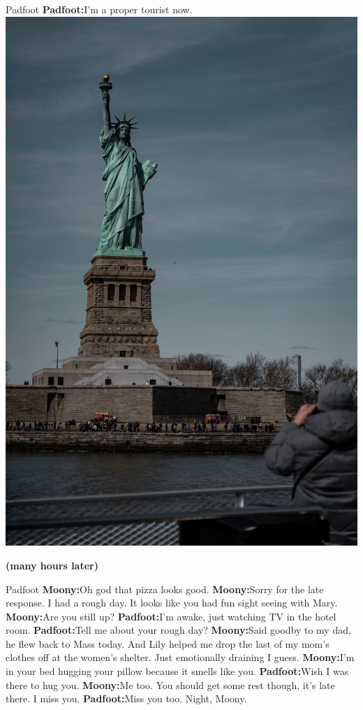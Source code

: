 \documentclass[12pt,twoside,openright]{memoir}
\begin{document}
Padfoot\newline
\textbf{Padfoot:}I'm a proper tourist now.  {\centering\includegraphics[width=\textwidth]{xiaochuan-xu-0fMSLUYClVI-unsplash}}

\textbf{(many hours later)} 

Padfoot\newline
\textbf{Moony:}Oh god that pizza looks good.\newline
\textbf{Moony:}Sorry for the late response. I had a rough day. It looks like you had fun sight seeing with Mary.
\textbf{Moony:}Are you still up?\newline
\textbf{Padfoot:}I'm awake, just watching TV in the hotel room.\newline
\textbf{Padfoot:}Tell me about your rough day?\newline
\textbf{Moony:}Said goodby to my dad, he flew back to Mass today. And Lily helped me drop the last of my mom's clothes off at the women's shelter. Just emotionally draining I guess.\newline
\textbf{Moony:}I'm in your bed hugging your pillow because it smells like you.\newline
\textbf{Padfoot:}Wish I was there to hug you.\newline
\textbf{Moony:}Me too. You should get some rest though, it's late there. I miss you.\newline
\textbf{Padfoot:}Miss you too. Night, Moony.
\end{document}

